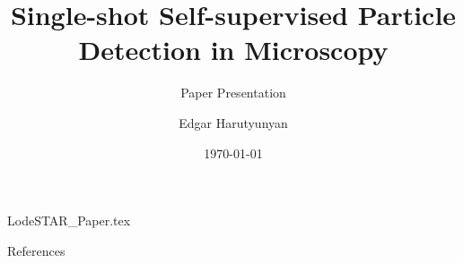 \documentclass[aspectratio=\BeamerAspectRatio]{beamer}
\title[LodeSTAR Project]{Single-shot Self-supervised Particle Detection in Microscopy}
\subtitle[]{Paper Presentation}
\author{Edgar Harutyunyan}
\institute
{Molecular Nanophotonics Group\\
Peter Debye Institute for Soft Matter Physics\\
Universit\"at Leipzig}
\date{\today}
\begin{document}
\maketitlepage

{LodeSTAR_Paper.tex}
\begin{frame}[plain]{References}
    \printbibliography
\end{frame}
\end{document}
